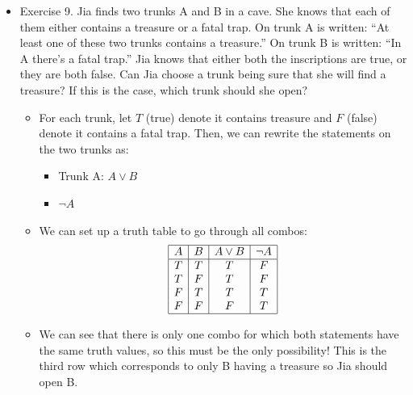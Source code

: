 \documentclass{article}
\begin{document}
\begin{itemize}
    \[
    \begin{array}{|c|c|c|c|c|}
        \hline
        A & B & A \vee B & A \wedge (A \vee B) & A \\
        \hline
        T & T & T & T & T \\
        T & F & T & T & T \\
        F & T & T & F & F \\
        F & F & F & F & F \\
        \hline
    \end{array}
    \]
    \item Exercise 9. Jia finds two trunks A and B in a cave. She knows that each of them either contains a treasure or a fatal trap. On trunk A is written: “At least one of these two trunks contains a treasure.” On trunk B is written: “In A there’s a fatal trap.” Jia knows that either both the inscriptions are true, or they are both false. Can Jia choose a trunk being sure that she will find a treasure? If this is the case, which trunk should she open?
    \begin{itemize}
        \item For each trunk, let $T$ (true) denote it contains treasure and $F$ (false) denote it contains a fatal trap. Then, we can rewrite the statements on the two trunks as:
        \begin{itemize}
            \item Trunk A: $A \vee B$
            \item $\neg A$
        \end{itemize}
        \item We can set up a truth table to go through all combos:
        \[
        \begin{array}{|c|c|c|c|}
            \hline
            A & B & A \vee B & \neg A \\
            \hline
            T & T & T & F \\
            T & F & T & F \\
            F & T & T & T \\
            F & F & F & T \\
            \hline
        \end{array}
        \]
        \item We can see that there is only one combo for which both statements have the same truth values, so this must be the only possibility! This is the third row which corresponds to only B having a treasure so Jia should open B.
    \end{itemize}
\end{itemize}
\end{document}
